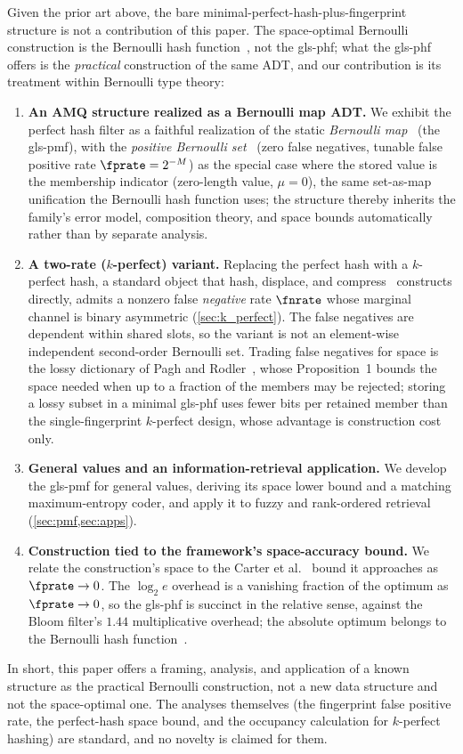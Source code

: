 \documentclass[ ../main.tex]{subfiles}
\begin{document}
Given the prior art above, the bare minimal-perfect-hash-plus-fingerprint structure is not a contribution of this paper. The space-optimal Bernoulli construction is the Bernoulli hash function~\cite{shs}, not the \gls{gls-phf}; what the \gls{gls-phf} offers is the \emph{practical} construction of the same ADT, and our contribution is its treatment within Bernoulli type theory:
\begin{enumerate}
    \item \textbf{An AMQ structure realized as a Bernoulli map ADT.} We exhibit the perfect hash filter as a faithful realization of the static \emph{Bernoulli map}~\cite{bmaps} (the \gls{gls-pmf}), with the \emph{positive Bernoulli set}~\cite{bsets} (zero false negatives, tunable false positive rate $\fprate = 2^{-M}$) as the special case where the stored value is the membership indicator (zero-length value, $\mu = 0$), the same set-as-map unification the Bernoulli hash function uses; the structure thereby inherits the family's error model, composition theory, and space bounds automatically rather than by separate analysis.
    \item \textbf{A two-rate ($k$-perfect) variant.} Replacing the perfect hash with a $k$-perfect hash, a standard object that hash, displace, and compress~\cite{chd} constructs directly, admits a nonzero false \emph{negative} rate $\fnrate$ whose marginal channel is binary asymmetric (\cref{sec:k_perfect}). The false negatives are dependent within shared slots, so the variant is not an element-wise independent second-order Bernoulli set. Trading false negatives for space is the lossy dictionary of Pagh and Rodler~\cite{pagh2001lossy}, whose Proposition~1 bounds the space needed when up to a fraction of the members may be rejected; storing a lossy subset in a minimal \gls{gls-phf} uses fewer bits per retained member than the single-fingerprint $k$-perfect design, whose advantage is construction cost only.
    \item \textbf{General values and an information-retrieval application.} We develop the \gls{gls-pmf} for general values, deriving its space lower bound and a matching maximum-entropy coder, and apply it to fuzzy and rank-ordered retrieval (\cref{sec:pmf,sec:apps}).
    \item \textbf{Construction tied to the framework's space-accuracy bound.} We relate the construction's space to the Carter et al.~\cite{carter1978} bound it approaches as $\fprate \to 0$. The $\log_2 e$ overhead is a vanishing fraction of the optimum as $\fprate \to 0$, so the \gls{gls-phf} is succinct in the relative sense, against the Bloom filter's $1.44$ multiplicative overhead; the absolute optimum belongs to the Bernoulli hash function~\cite{shs}.
\end{enumerate}
In short, this paper offers a framing, analysis, and application of a known structure as the practical Bernoulli construction, not a new data structure and not the space-optimal one. The analyses themselves (the fingerprint false positive rate, the perfect-hash space bound, and the occupancy calculation for $k$-perfect hashing) are standard, and no novelty is claimed for them.
\end{document}
